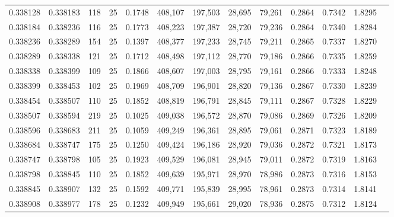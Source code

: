 \begin{tabular}{rrrrrrrrrrrrr}
0.338128 & 0.338183 &   118 &  25 &                                     0.1748 & 408,107 & 197,503 &  28,695 &  79,261 & 0.2864 & 0.7342 & 1.8295 \\
0.338184 & 0.338236 &   116 &  25 &                                     0.1773 & 408,223 & 197,387 &  28,720 &  79,236 & 0.2864 & 0.7340 & 1.8284 \\
0.338236 & 0.338289 &   154 &  25 &                                     0.1397 & 408,377 & 197,233 &  28,745 &  79,211 & 0.2865 & 0.7337 & 1.8270 \\
0.338289 & 0.338338 &   121 &  25 &                                     0.1712 & 408,498 & 197,112 &  28,770 &  79,186 & 0.2866 & 0.7335 & 1.8259 \\
0.338338 & 0.338399 &   109 &  25 &                                     0.1866 & 408,607 & 197,003 &  28,795 &  79,161 & 0.2866 & 0.7333 & 1.8248 \\
0.338399 & 0.338453 &   102 &  25 &                                     0.1969 & 408,709 & 196,901 &  28,820 &  79,136 & 0.2867 & 0.7330 & 1.8239 \\
0.338454 & 0.338507 &   110 &  25 &                                     0.1852 & 408,819 & 196,791 &  28,845 &  79,111 & 0.2867 & 0.7328 & 1.8229 \\
0.338507 & 0.338594 &   219 &  25 &                                     0.1025 & 409,038 & 196,572 &  28,870 &  79,086 & 0.2869 & 0.7326 & 1.8209 \\
0.338596 & 0.338683 &   211 &  25 &                                     0.1059 & 409,249 & 196,361 &  28,895 &  79,061 & 0.2871 & 0.7323 & 1.8189 \\
0.338684 & 0.338747 &   175 &  25 &                                     0.1250 & 409,424 & 196,186 &  28,920 &  79,036 & 0.2872 & 0.7321 & 1.8173 \\
0.338747 & 0.338798 &   105 &  25 &                                     0.1923 & 409,529 & 196,081 &  28,945 &  79,011 & 0.2872 & 0.7319 & 1.8163 \\
0.338798 & 0.338845 &   110 &  25 &                                     0.1852 & 409,639 & 195,971 &  28,970 &  78,986 & 0.2873 & 0.7316 & 1.8153 \\
0.338845 & 0.338907 &   132 &  25 &                                     0.1592 & 409,771 & 195,839 &  28,995 &  78,961 & 0.2873 & 0.7314 & 1.8141 \\
0.338908 & 0.338977 &   178 &  25 &                                     0.1232 & 409,949 & 195,661 &  29,020 &  78,936 & 0.2875 & 0.7312 & 1.8124 \\

\end{tabular}
